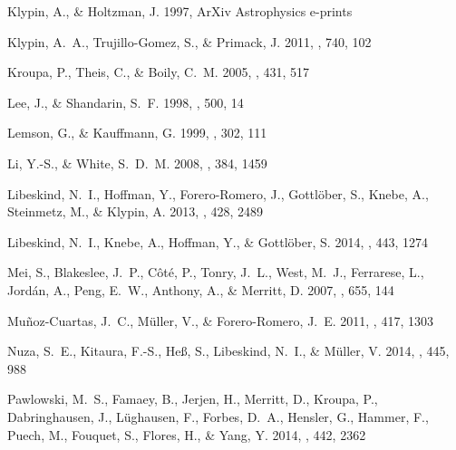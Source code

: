 \documentclass{emulateapj}
\begin{document}
\begin{thebibliography}{48}
{Klypin}, A., \& {Holtzman}, J. 1997, ArXiv Astrophysics e-prints

{Klypin}, A.~A., {Trujillo-Gomez}, S., \& {Primack}, J. 2011, \apj, 740, 102

{Kroupa}, P., {Theis}, C., \& {Boily}, C.~M. 2005, \aap, 431, 517

{Lee}, J., \& {Shandarin}, S.~F. 1998, \apj, 500, 14

{Lemson}, G., \& {Kauffmann}, G. 1999, \mnras, 302, 111

{Li}, Y.-S., \& {White}, S.~D.~M. 2008, \mnras, 384, 1459

{Libeskind}, N.~I., {Hoffman}, Y., {Forero-Romero}, J., {Gottl{\"o}ber}, S.,
  {Knebe}, A., {Steinmetz}, M., \& {Klypin}, A. 2013, \mnras, 428, 2489

{Libeskind}, N.~I., {Knebe}, A., {Hoffman}, Y., \& {Gottl{\"o}ber}, S. 2014,
  \mnras, 443, 1274

{Mei}, S., {Blakeslee}, J.~P., {C{\^o}t{\'e}}, P., {Tonry}, J.~L., {West},
  M.~J., {Ferrarese}, L., {Jord{\'a}n}, A., {Peng}, E.~W., {Anthony}, A., \&
  {Merritt}, D. 2007, \apj, 655, 144

{Mu{\~n}oz-Cuartas}, J.~C., {M{\"u}ller}, V., \& {Forero-Romero}, J.~E. 2011,
  \mnras, 417, 1303

{Nuza}, S.~E., {Kitaura}, F.-S., {He{\ss}}, S., {Libeskind}, N.~I., \&
  {M{\"u}ller}, V. 2014, \mnras, 445, 988

{Pawlowski}, M.~S., {Famaey}, B., {Jerjen}, H., {Merritt}, D., {Kroupa}, P.,
  {Dabringhausen}, J., {L{\"u}ghausen}, F., {Forbes}, D.~A., {Hensler}, G.,
  {Hammer}, F., {Puech}, M., {Fouquet}, S., {Flores}, H., \& {Yang}, Y. 2014,
  \mnras, 442, 2362


\end{thebibliography}
\end{document}
